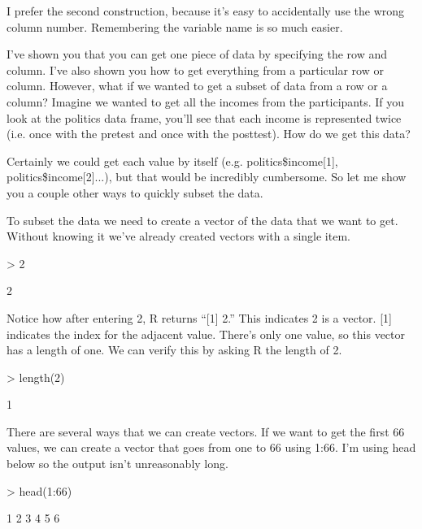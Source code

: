 \documentclass[12pt]{article}
\begin{document}
I prefer the second construction, because it's easy to accidentally use the
wrong column number. Remembering the variable name is so much easier.

I've shown you that you can get one piece of data by specifying the row and column.
I've also shown you how to get everything from a particular row or column. However,
what if we wanted to get a subset of data from a row or a column? Imagine we
wanted to get all the incomes from the participants. If you look at the politics
data frame, you'll see that each income is represented twice (i.e. once with
the pretest and once with the posttest). How do we get this data?

Certainly we could get each value by itself (e.g. politics\$income[1],
politics\$income[2]...), but that would be incredibly cumbersome. So let me show
you a couple other ways to quickly subset the data.

To subset the data we need to create a vector of the data that we want to get.
Without knowing it we've already created vectors with a single item.

\begin{Schunk}
\begin{Sinput}
> 2
\end{Sinput}
\begin{Soutput}
[1] 2
\end{Soutput}
\end{Schunk}

Notice how after entering 2, R returns ``[1] 2.'' This indicates 2 is a vector.
[1] indicates the index for the adjacent value. There's only one value, so this
vector has a length of one. We can verify this by asking R the length of 2.

\begin{Schunk}
\begin{Sinput}
> length(2)
\end{Sinput}
\begin{Soutput}
[1] 1
\end{Soutput}
\end{Schunk}

There are several ways that we can create vectors. If we want to get the first
66 values, we can create a vector that goes from one to 66 using 1:66. I'm
using head below so the output isn't unreasonably long.

\begin{Schunk}
\begin{Sinput}
> head(1:66)
\end{Sinput}
\begin{Soutput}
[1] 1 2 3 4 5 6
\end{Soutput}
\end{Schunk}
\end{document}
